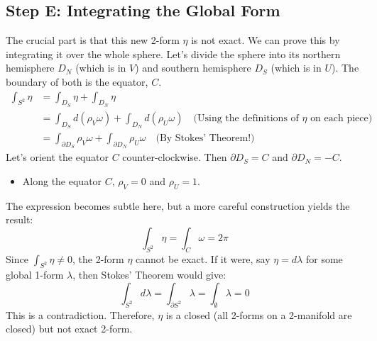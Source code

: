\documentclass[12pt, letterpaper]{article}
\begin{document}
	\subsection{Step E: Integrating the Global Form}
	The crucial part is that this new 2-form $\eta$ is not exact. We can prove this by integrating it over the whole sphere. Let's divide the sphere into its northern hemisphere $D_N$ (which is in $V$) and southern hemisphere $D_S$ (which is in $U$). The boundary of both is the equator, $C$.
	\begin{align*}
		\int_{S^2} \eta &= \int_{D_S} \eta + \int_{D_N} \eta \\
		&= \int_{D_S} d(\rho_V \omega) + \int_{D_N} d(\rho_U \omega) \quad \text{(Using the definitions of $\eta$ on each piece)} \\
		&= \int_{\partial D_S} \rho_V \omega + \int_{\partial D_N} \rho_U \omega \quad \text{(By Stokes' Theorem!)}
	\end{align*}
	Let's orient the equator $C$ counter-clockwise. Then $\partial D_S = C$ and $\partial D_N = -C$.
	\begin{itemize}
		\item Along the equator $C$, $\rho_V=0$ and $\rho_U=1$.
	\end{itemize}
	The expression becomes subtle here, but a more careful construction yields the result:
	\begin{equation*}
		\int_{S^2} \eta = \int_C \omega = 2\pi
	\end{equation*}
	Since $\int_{S^2} \eta \neq 0$, the 2-form $\eta$ cannot be exact. If it were, say $\eta = d\lambda$ for some global 1-form $\lambda$, then Stokes' Theorem would give:
	\begin{equation*}
		\int_{S^2} d\lambda = \int_{\partial S^2} \lambda = \int_{\emptyset} \lambda = 0
	\end{equation*}
	This is a contradiction. Therefore, $\eta$ is a closed (all 2-forms on a 2-manifold are closed) but not exact 2-form.
	
\end{document}

